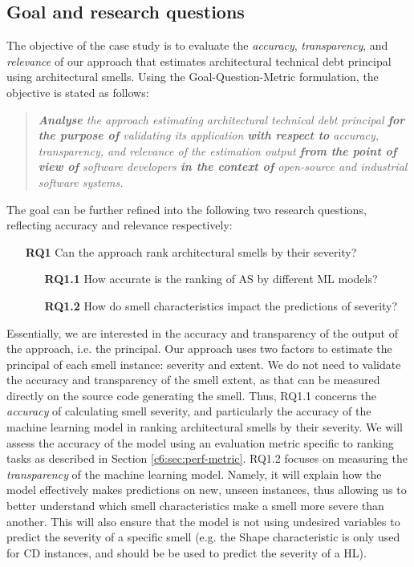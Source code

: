 
\subsection{Goal and research questions}\label{c6:sec:goal-and-rqs}
The objective of the case study is to evaluate the \emph{accuracy}, \emph{transparency}, and \emph{relevance} of our approach that estimates architectural technical debt principal using architectural smells.
Using the Goal-Question-Metric \cite{VanSolingen2002} formulation, the objective is stated as follows:
\begin{quote}
    \itshape
    \textbf{Analyse} the approach estimating architectural technical debt principal \textbf{for the purpose of} validating its application \textbf{with respect to} accuracy, transparency, and relevance of the estimation output \textbf{from the point of view of} software developers \textbf{in the context of} open-source and industrial software systems.
\end{quote}
The goal can be further refined into the following two research questions, reflecting accuracy and relevance respectively:
\begin{itemize}
    \item[\textbf{RQ1}] Can the approach rank architectural smells by their severity?
    \begin{itemize}
        \item[\textbf{RQ1.1}] How accurate is the ranking of AS by different ML models?
        \item[\textbf{RQ1.2}] How do smell characteristics impact the predictions of severity?
    \end{itemize}
\end{itemize}
Essentially, we are interested in the accuracy and transparency of the output of the approach, i.e. the principal. Our approach uses two factors to estimate the principal of each smell instance: severity and extent. We do not need to validate the accuracy and transparency of the smell extent, as that can be measured directly on the source code generating the smell. 
Thus, RQ1.1 concerns the \emph{accuracy} of calculating smell severity, and particularly the accuracy of the machine learning model in ranking architectural smells by their severity.
We will assess the accuracy of the model using an evaluation metric specific to ranking tasks as described in Section \ref{c6:sec:perf-metric}.
RQ1.2 focuses on measuring the \emph{transparency} of the machine learning model. Namely, it will explain how the model effectively makes predictions on new, unseen instances, thus allowing us to better understand which smell characteristics make a smell more severe than another.
This will also ensure that the model is not using undesired variables to predict the severity of a specific smell (e.g. the Shape characteristic is only used for CD instances, and should be be used to predict the severity of a HL).

